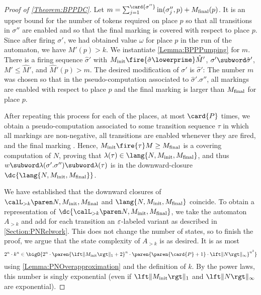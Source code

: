 \documentclass[../../diss.tex]{subfiles}
\begin{document}
\begin{proof}[Proof of \cref{Theorem:BPPDC}]
    Let $m = \sum_{j = 1}^{\card{\sigma''}} \i(\sigma''_j,p) + \Mfinal(p)$.
    It is an upper bound for the number of tokens required on place $p$ so that all transitions in $\sigma''$ are enabled and so that the final marking is covered with respect to place $p$.
    Since after firing $\sigma'$, we had obtained value $\omega$ for place $p$ in the run of the automaton, we have $M' (p) > k$.
    We instantiate \cref{Lemma:BPPPumping} for $m$.
    There is a firing sequence $\hat{\sigma}'$ with $\Minit \fire{\hat{\sigma}\lowerprime} \hat{M}'$, $\sigma' \subword \hat{\sigma}'$, $M' \leq \hat{M}'$, and $\hat{M}'(p) > m$.
    The desired modification of $\sigma'$ is $\hat{\sigma}'$:
    The number $m$ was chosen so that in the pseudo-computation associated to $\hat{\sigma}'.\sigma''$, all markings are enabled with respect to place $p$ and the final marking is larger than $M_{\text{final}}$ for place $p$.

    After repeating this process for each of the places, \ie at most $\card{P}$ times, we obtain a pseudo-computation associated to some transition sequence $\tau$ in which all markings are non-negative, all transitions are enabled whenever they are fired, and the final marking .
    Hence, $\Minit \fire{\tau} M \geq \Mfinal$ is a covering computation of $N$, proving that $\lambda(\tau) \in \lang{N,\Minit,\Mfinal}$, and thus $w \subword \lambda(\sigma'.\sigma'') \subword \lambda(\tau)$ is in the downward-closure $\dc{\lang{N,\Minit,\Mfinal}}$.

    We have established that the downward closures of $\langoak{k}{N,\Minit,\Mfinal}$ and $\lang{N,\Minit,\Mfinal}$ coincide.
    To obtain a representation of $\dc{\langoak{k}{N,\Minit,\Mfinal}}$, we take the automaton $A_{> k}$ and add for each transition an $\varepsilon$-labeled variant as described in \cref{Section:PNRelwork}.
    This does not change the number of states, so to finish the proof, we argue that the state complexity of $A_{> k}$ is as desired.
    It is as most
    \[
         2^n \cdot k^n
         \in \bigO{
             2^n
             \cdot
             \paren{\normone{\Minit}+2}^n
             \cdot
             \paren{ \paren{\card{P}+1} \cdot \norminf{N}}^{ n^2 }
         }
    \]
    using \cref{Lemma:PNOverapproximation} and the definition of $k$.
    By the power laws, this number is singly exponential (even if $\normone{\Minit}$ and $\norminf{N}$ are exponential).
\end{proof}
\end{document}
